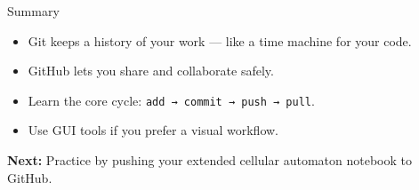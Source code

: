 \documentclass[aspectratio=169,13pt]{beamer}
\begin{document}
\begin{frame}{Summary}
    \begin{itemize}
        \item Git keeps a history of your work — like a time machine for your code.
        \item GitHub lets you share and collaborate safely.
        \item Learn the core cycle: \texttt{add → commit → push → pull}.
        \item Use GUI tools if you prefer a visual workflow.
    \end{itemize}

    \vspace{1em}
    \begin{center}
        \textbf{Next:} Practice by pushing your extended cellular automaton notebook to GitHub.
    \end{center}
\end{frame}
\end{document}
